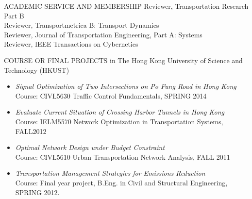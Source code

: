 \documentclass{resume} %
\begin{document}
\begin{rSection}{ACADEMIC SERVICE AND MEMBERSHIP}
Reviewer, Transportation Research Part B \\
Reviewer, Transportmetrica B: Transport Dynamics\\
Reviewer, Journal of Transportation Engineering, Part A: Systems\\
Reviewer, IEEE Transactions on Cybernetics\\
\end{rSection}
\begin{rSection}{COURSE OR FINAL PROJECTS}
in The Hong Kong University of Science and Technology (HKUST)
\begin{itemize}\itemsep -3pt
\item \textit{Signal Optimization of Two Intersections on Po Fung Road in Hong Kong}\\
Course: CIVL5630 Traffic Control Fundamentals, SPRING 2014
\item \textit{Evaluate Current Situation of Crossing Harbor Tunnels in Hong Kong} \\
Course: IELM5570 Network Optimization in Transportation Systems, FALL2012
\item \textit{Optimal Network Design under Budget Constraint}
\\Course: CIVL5610 Urban Transportation Network Analysis, FALL 2011
\item \textit{Transportation Management Strategies for Emissions Reduction}
\\ Course: Final year project, B.Eng. in Civil and Structural Engineering,
SPRING 2012.
\end{itemize}
\end{rSection}
\end{document}
